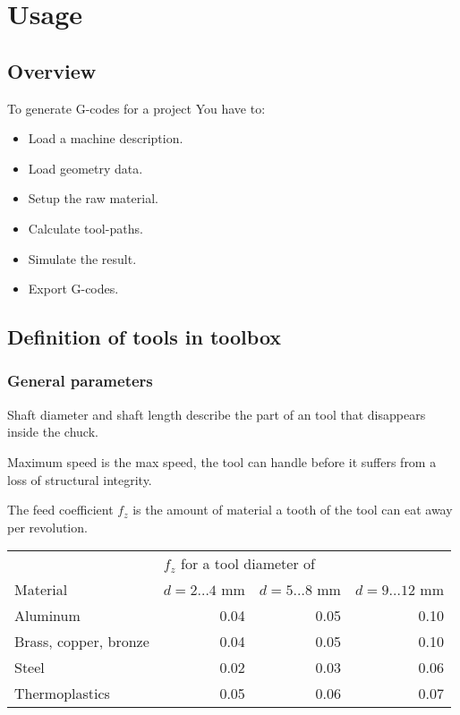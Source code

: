 \chapter{Usage}

\section{Overview}

To generate G-codes for a project You have to:

\begin{itemize}
\item Load a machine description.
\item Load geometry data.
\item Setup the raw material.
\item Calculate tool-paths.
\item Simulate the result.
\item Export G-codes.
\end{itemize}

\section{Definition of tools in toolbox}

\subsection{General parameters}

Shaft diameter and shaft length describe the part of an tool that
disappears inside the chuck. 

Maximum speed is the max speed, the tool can handle  before it suffers
from a loss of structural integrity.

The feed coefficient $f_z$ is the amount of material a tooth of the tool
can eat away per revolution. 

\begin{table}[htb]
\begin{tabular}{|l|r|r|r|}
\hline
&\multicolumn{3}{|l|}{$f_z$ for a tool diameter of}\\
Material&$d=2\ldots4$ mm&$d=5\ldots8$ mm&$d=9\ldots12$ mm\\
\hline
Aluminum&0.04&0.05&0.10\\
Brass, copper, bronze&0.04&0.05&0.10\\
Steel&0.02&0.03&0.06\\
Thermoplastics&0.05&0.06&0.07\\
\hline
\end{tabular}
\end{table}



